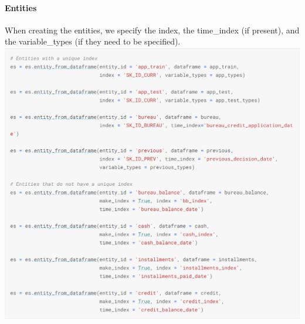 \documentclass[twoside,a4paper]{article}
\begin{document}
\paragraph{Entities}
When creating the entities, we specify the index, the time\_index (if present), and the variable\_types (if they need to be specified).\\
\includegraphics[scale=.8]{16.png}
\end{document}

